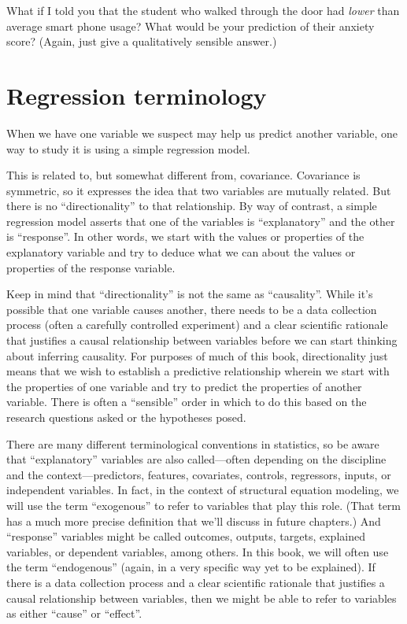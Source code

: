 \documentclass[
]{book}
\begin{document}
What if I told you that the student who walked through the door had \emph{lower} than average smart phone usage? What would be your prediction of their anxiety score? (Again, just give a qualitatively sensible answer.)

\hypertarget{simple-terminology}{%
\section{Regression terminology}\label{simple-terminology}}

When we have one variable we suspect may help us predict another variable, one way to study it is using a simple regression model.

This is related to, but somewhat different from, covariance. Covariance is symmetric, so it expresses the idea that two variables are mutually related. But there is no ``directionality'' to that relationship. By way of contrast, a simple regression model asserts that one of the variables is ``explanatory'' and the other is ``response''. In other words, we start with the values or properties of the explanatory variable and try to deduce what we can about the values or properties of the response variable.

Keep in mind that ``directionality'' is not the same as ``causality''. While it's possible that one variable causes another, there needs to be a data collection process (often a carefully controlled experiment) and a clear scientific rationale that justifies a causal relationship between variables before we can start thinking about inferring causality. For purposes of much of this book, directionality just means that we wish to establish a predictive relationship wherein we start with the properties of one variable and try to predict the properties of another variable. There is often a ``sensible'' order in which to do this based on the research questions asked or the hypotheses posed.

There are many different terminological conventions in statistics, so be aware that ``explanatory'' variables are also called---often depending on the discipline and the context---predictors, features, covariates, controls, regressors, inputs, or independent variables. In fact, in the context of structural equation modeling, we will use the term ``exogenous'' to refer to variables that play this role. (That term has a much more precise definition that we'll discuss in future chapters.) And ``response'' variables might be called outcomes, outputs, targets, explained variables, or dependent variables, among others. In this book, we will often use the term ``endogenous'' (again, in a very specific way yet to be explained). If there is a data collection process and a clear scientific rationale that justifies a causal relationship between variables, then we might be able to refer to variables as either ``cause'' or ``effect''.
\end{document}
